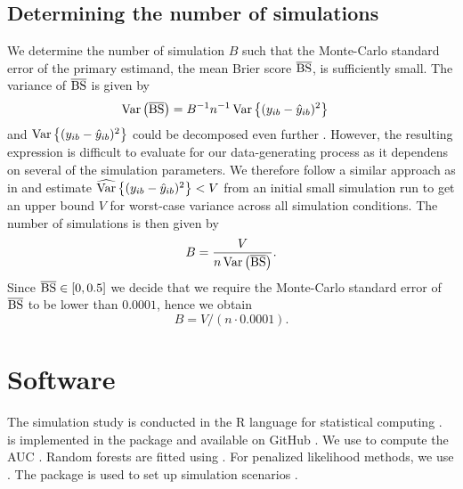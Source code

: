 \documentclass[a4paper, 11pt]{article}\usepackage[]{graphicx}\usepackage[]{color}
\begin{document}
\subsection*{Determining the number of simulations}
We determine the number of simulation $B$ such that the Monte-Carlo
standard error of the primary estimand, the mean Brier score $\operatorname{\overline{BS}}$,
is sufficiently small. The variance of $\operatorname{\overline{BS}}$ is given by
\begin{align*}
  \operatorname{Var}\left(\operatorname{\overline{BS}}\right)
  &= B^{-1}n^{-1}\operatorname{Var}\left\{(y_{ib} - \hat{y}_{ib})^{2}\right\}
\end{align*}
and $\operatorname{Var}\left\{(y_{ib} - \hat{y}_{ib})^{2}\right\}$ could be decomposed even
further \citep{Bradley2008}. However, the resulting expression is difficult to
evaluate for our data-generating process as it dependens on several of the
simulation parameters. We therefore follow a similar approach as in
\citet{Morris2019} and estimate
$\widehat{\operatorname{Var}}\left\{(y_{ib} - \hat{y}_{ib})^{2}\right\} < V$ from an initial
small simulation run to get an upper bound $V$ for worst-case variance across
all simulation conditions. The number of simulations is then given by
$$B = \frac{V}{n \operatorname{Var}\left(\operatorname{\overline{BS}}\right)}.$$
Since $\operatorname{\overline{BS}} \in [0, 0.5]$ we decide that we require the Monte-Carlo standard
error of $\operatorname{\overline{BS}}$ to be lower than $0.0001$, hence we obtain
$$B =V/(n \cdot 0.0001).$$


\section{Software} \label{sec:software}

The simulation study is conducted in the \textsf{R} language for statistical
computing . \ainet~ is implemented in the  package 
and available on GitHub .
We use  to compute the AUC \citep{pkg:proc}. 
Random forests are fitted using .
For penalized likelihood methods, we use  \citep{Friedman2010,Simon2011} 
.
The  package is used to set up simulation scenarios
\citep{Chalmers2020}.





% 
% 
\end{document}
